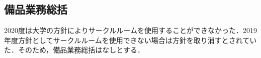 \subsection*{備品業務総括}

2020度は大学の方針によりサークルルームを使用することができなかった．2019年度方針としてサークルルームを使用できない場合は方針を取り消すとされていた．そのため，備品業務総括はなしとする．
